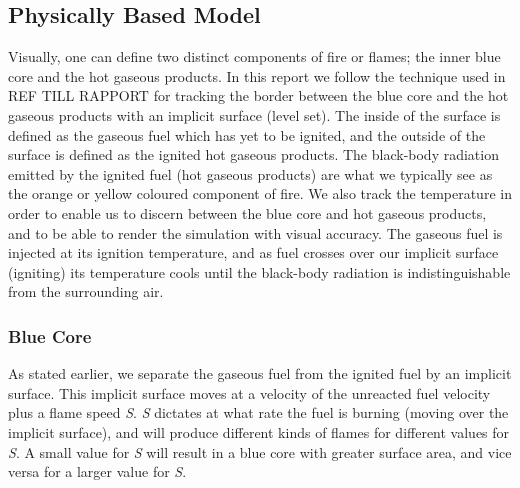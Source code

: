 \subsection{Physically Based Model}
Visually, one can define two distinct components of fire or flames; the inner blue core and the hot gaseous products. In this report we follow the technique used in REF TILL RAPPORT for tracking the border between the blue core and the hot gaseous products with an implicit surface (level set). The inside of the surface is defined as the gaseous fuel which has yet to be ignited, and the outside of the surface is defined as the ignited hot gaseous products. The black-body radiation emitted by the ignited fuel (hot gaseous products) are what we typically see as the orange or yellow coloured component of fire. We also track the temperature in order to enable us to discern between the blue core and hot gaseous products, and to be able to render the simulation with visual accuracy. The gaseous fuel is injected at its ignition temperature, and as fuel crosses over our implicit surface (igniting) its temperature cools until the black-body radiation is indistinguishable from the surrounding air.
\subsubsection{Blue Core}
As stated earlier, we separate the gaseous fuel from the ignited fuel by an implicit surface. This implicit surface moves at a velocity of the unreacted fuel velocity plus a flame speed \emph{S}. \emph{S} dictates at what rate the fuel is burning (moving over the implicit surface), and will produce different kinds of flames for different values for \emph{S}. A small value for \emph{S} will result in a blue core with greater surface area, and vice versa for a larger value for \emph{S}.
